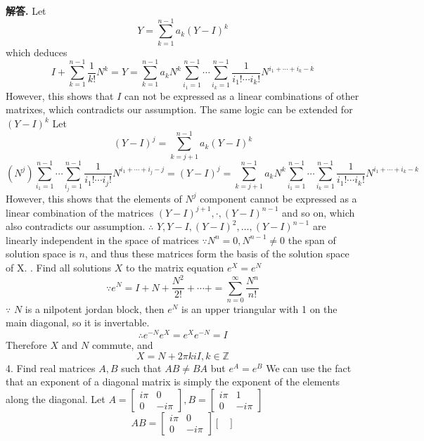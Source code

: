 \documentclass[12pt, a4paper, oneside]{article}
\newenvironment{solution}{\par\noindent\textbf{解答. }}{\par}
\begin{document}
\begin{CJK}{UTF8}{gbsn}
\begin{solution}
  Let $$Y = \sum_{k=1}^{n-1}{a_k(Y-I)^k}$$
  which deduces
  $$ I + \sum^{n-1}_{k=1} \frac{1}{k!} N^k = Y =  \sum^{n-1}_{k=1}{a_kN^k}\sum_{i_1=1}^{n-1}\cdots\sum_{i_k=1}^{n-1}\frac{1}{i_1!\cdots i_k!}N^{i_1+\cdots+i_k - k}$$
  However, this shows that $I$ can not be expressed as a linear combinations of other matrixes, which contradicts our assumption. The same logic can be extended for $(Y-I)^k$ \newline
  Let 
  $$ (Y-I)^j= \sum^{n-1}_{k=j+1}{a_k(Y-I)^k} $$ 
  $$ (N^j) \sum_{i_1=1}^{n-1}\cdots\sum_{i_j=1}^{n-1}\frac{1}{i_1!\cdots i_j!}N^{i_1+\cdots+i_j - j} = (Y-I)^j =  \sum^{n-1}_{k=j+1}{a_kN^k}\sum_{i_1=1}^{n-1}\cdots\sum_{i_k=1}^{n-1}\frac{1}{i_1!\cdots i_k!}N^{i_1+\cdots+i_k - k}$$
  However, this shows that the elements of $N^j$  component cannot be expressed as a linear combination of the matrices $(Y-I)^{j+1}, \cdot, (Y-I)^{n-1}$  and so on, which also contradicts our assumption. \newline
  $\therefore$ $Y,Y-I,(Y-I)^2,\dots,(Y-I)^{n-1}$ are linearly independent in the space of matrices \newline
  $\because N^n = 0, N^{n-1} \neq 0$ the span of solution space is $n$, and thus these matrices form the basis of the solution space of X. . Find all solutions $X$ to the matrix equation $e^X=e^N$ \newline
  $$ \because e^N = I + N + \frac{N^2}{2!} + \cdots +  = \sum_{n=0}^{\infty} \frac{N^n}{n!}$$
  $\because$ $N$ is a nilpotent jordan block, then $e^N$ is an upper triangular with 1 on the main diagonal, so it is invertable. 
  $$ \therefore e^{-N}e^X= e^Xe^{-N} = I$$
  Therefore $X$ and $N$ commute, and $$X=N + 2\pi kiI, k\in\mathbb{Z}$$
  4. Find real matrices $A, B$ such that $AB\neq BA$ but $e^A=e^B$ \newline
  We can use the fact that an exponent of a diagonal matrix is simply the exponent of the elements along the diagonal.
  Let $A = \begin{bmatrix}
    i\pi & 0 \\ 0 & -i\pi 
  \end{bmatrix}, B = \begin{bmatrix}
    i\pi & 1 \\ 0 & -i\pi
  \end{bmatrix} $ 
  $$ AB = \begin{bmatrix}
    i\pi & 0 \\ 0 & -i\pi 
  \end{bmatrix}  \begin{bmatrix}

\end{bmatrix}$$
\end{solution}
\end{CJK}
\end{document}
